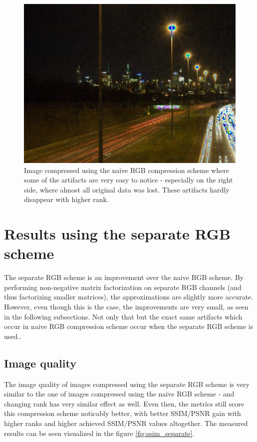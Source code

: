 \documentclass[thesis=M,english]{FITthesis}[2012/10/20]
\begin{document}
\begin{figure}[h]
  \centering
  \includegraphics[scale=0.3]{imgs/results/nightshot_artifacts}
  \caption[Artifacts occuring in naive RGB compression scheme]{Image compressed using the
           naive RGB compression scheme where some of the artifacts are very
           easy to notice - especially on the right side, where almost all original data
           was lost. These artifacts hardly disappear with higher rank.}
  \label{fig:artifacts_naive}
\end{figure}


\section{Results using the separate RGB scheme}
The separate RGB scheme is an improvement over the naive RGB scheme. By performing
non-negative matrix factorization on separate RGB channels (and thus factorizing
smaller matrices), the approximations are slightly more accurate. However, even though
this is the case, the improvements are very small, as seen in the following subsections.
Not only that but the exact same artifacts which occur in naive RGB compression scheme occur when
the separate RGB scheme is used..

\subsection{Image quality}
The image quality of images compressed using the separate RGB scheme is very similar
to the one of images compressed using the naive RGB scheme - and changing rank has
very similar effect as well. Even then, the metrics still score this compression scheme
noticably better, with better SSIM/PSNR gain with higher ranks and higher achieved SSIM/PSNR values
altogether. The measured results can be seen visualized in the figure \ref{fig:ssim_separate}.
\end{document}
